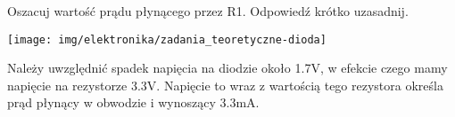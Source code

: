 % 
% 
% 
% 




%
%

\dbEntryCheckResults
\begin{minipage}[c]{0.64\textwidth}
	Oszacuj wartość prądu płynącego przez R1. Odpowiedź krótko uzasadnij.
\end{minipage}
\hfill
\begin{minipage}[c]{0.32\textwidth}
	\texttt{[image: img/elektronika/zadania\_teoretyczne-dioda]}
\end{minipage}
\fi
{}\dbEntryCheckResults
Należy uwzględnić spadek napięcia na diodzie około 1.7V, w efekcie czego mamy napięcie na rezystorze 3.3V.
Napięcie to wraz z wartością tego rezystora określa prąd płynący w obwodzie i wynoszący 3.3mA.
\fi


